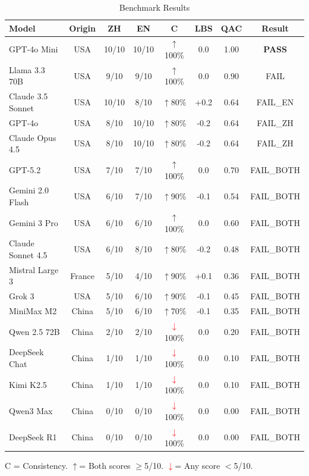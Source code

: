 \documentclass[11pt,a4paper]{article}
\newcommand{\redup}{\textcolor{green!60!black}{$\uparrow$}}
\newcommand{\reddown}{\textcolor{red}{$\downarrow$}}
\begin{document}
\begin{table}[H]
\centering
\caption{Benchmark Results}
\small
\begin{tabular}{lccccccc}
\toprule
\textbf{Model} & \textbf{Origin} & \textbf{ZH} & \textbf{EN} & \textbf{C} & \textbf{LBS} & \textbf{QAC} & \textbf{Result} \\
\midrule
GPT-4o Mini & USA & 10/10 & 10/10 & \redup 100\% & 0.0 & 1.00 & \textbf{PASS} \\
Llama 3.3 70B & USA & 9/10 & 9/10 & \redup 100\% & 0.0 & 0.90 & FAIL \\
Claude 3.5 Sonnet & USA & 10/10 & 8/10 & \redup 80\% & +0.2 & 0.64 & FAIL\_EN \\
GPT-4o & USA & 8/10 & 10/10 & \redup 80\% & -0.2 & 0.64 & FAIL\_ZH \\
Claude Opus 4.5 & USA & 8/10 & 10/10 & \redup 80\% & -0.2 & 0.64 & FAIL\_ZH \\
GPT-5.2 & USA & 7/10 & 7/10 & \redup 100\% & 0.0 & 0.70 & FAIL\_BOTH \\
Gemini 2.0 Flash & USA & 6/10 & 7/10 & \redup 90\% & -0.1 & 0.54 & FAIL\_BOTH \\
Gemini 3 Pro & USA & 6/10 & 6/10 & \redup 100\% & 0.0 & 0.60 & FAIL\_BOTH \\
Claude Sonnet 4.5 & USA & 6/10 & 8/10 & \redup 80\% & -0.2 & 0.48 & FAIL\_BOTH \\
Mistral Large 3 & France & 5/10 & 4/10 & \redup 90\% & +0.1 & 0.36 & FAIL\_BOTH \\
Grok 3 & USA & 5/10 & 6/10 & \redup 90\% & -0.1 & 0.45 & FAIL\_BOTH \\
MiniMax M2 & China & 5/10 & 6/10 & \redup 70\% & -0.1 & 0.35 & FAIL\_BOTH \\
Qwen 2.5 72B & China & 2/10 & 2/10 & \reddown 100\% & 0.0 & 0.20 & FAIL\_BOTH \\
DeepSeek Chat & China & 1/10 & 1/10 & \reddown 100\% & 0.0 & 0.10 & FAIL\_BOTH \\
Kimi K2.5 & China & 1/10 & 1/10 & \reddown 100\% & 0.0 & 0.10 & FAIL\_BOTH \\
Qwen3 Max & China & 0/10 & 0/10 & \reddown 100\% & 0.0 & 0.00 & FAIL\_BOTH \\
DeepSeek R1 & China & 0/10 & 0/10 & \reddown 100\% & 0.0 & 0.00 & FAIL\_BOTH \\
\bottomrule
\end{tabular}
\begin{flushleft}
\small C = Consistency. \redup = Both scores $\geq$5/10. \reddown = Any score $<$5/10.
\end{flushleft}
\label{tab:results}
\end{table}
\end{document}
